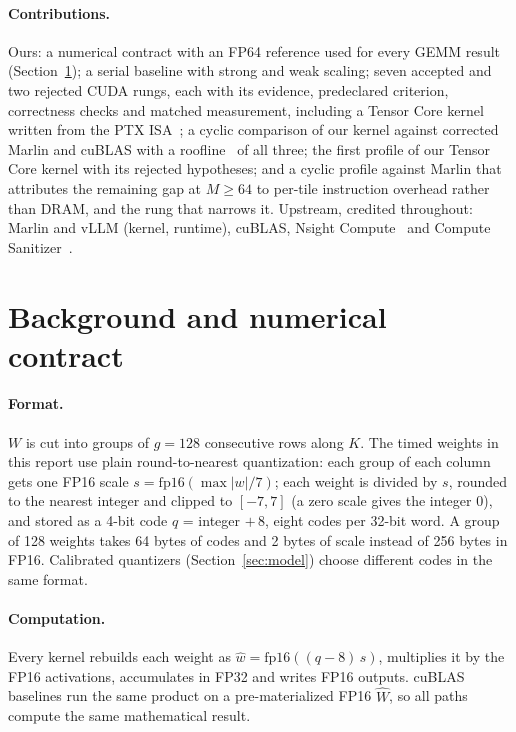 \documentclass[sigconf,nonacm]{acmart}
\begin{document}
\paragraph{Contributions.} Ours: a numerical contract with an FP64 reference used for every GEMM result (Section~\ref{sec:contract}); a serial baseline with strong and weak scaling; seven accepted and two rejected CUDA rungs, each with its evidence, predeclared criterion, correctness checks and matched measurement, including a Tensor Core kernel written from the PTX ISA~\cite{ptx}; a cyclic comparison of our kernel against corrected Marlin and cuBLAS with a roofline~\cite{roofline} of all three; the first profile of our Tensor Core kernel with its rejected hypotheses; and a cyclic profile against Marlin that attributes the remaining gap at $M \ge 64$ to per-tile instruction overhead rather than DRAM, and the rung that narrows it. Upstream, credited throughout: Marlin and vLLM (kernel, runtime), cuBLAS, Nsight Compute~\cite{nsight} and Compute Sanitizer~\cite{sanitizer}.

\section{Background and numerical contract}
\label{sec:contract}
\paragraph{Format.} $W$ is cut into groups of $g=128$ consecutive rows along $K$. The timed weights in this report use plain round-to-nearest quantization: each group of each column gets one FP16 scale $s = \mathrm{fp16}(\max|w|/7)$; each weight is divided by $s$, rounded to the nearest integer and clipped to $[-7,7]$ (a zero scale gives the integer 0), and stored as a 4-bit code $q$ = integer $+\,8$, eight codes per 32-bit word. A group of 128 weights takes 64 bytes of codes and 2 bytes of scale instead of 256 bytes in FP16. Calibrated quantizers (Section~\ref{sec:model}) choose different codes in the same format.

\paragraph{Computation.} Every kernel rebuilds each weight as $\hat w = \mathrm{fp16}((q-8)\,s)$, multiplies it by the FP16 activations, accumulates in FP32 and writes FP16 outputs. cuBLAS baselines run the same product on a pre-materialized FP16 $\hat W$, so all paths compute the same mathematical result.
\end{document}
